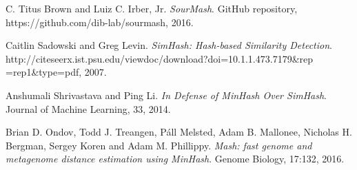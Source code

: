 \documentclass[12pt, letterpaper]{article}
\begin{document}
\begin{thebibliography}{9}

  C. Titus Brown and Luiz C. Irber, Jr.
  \textit{SourMash}.
  GitHub repository, https://github.com/dib-lab/sourmash, 2016.
  
  Caitlin Sadowski and Greg Levin.
  \textit{SimHash: Hash-based Similarity Detection}.
  http://citeseerx.ist.psu.edu/viewdoc/download?doi=10.1.1.473.7179\&rep\\=rep1\&type=pdf, 
  2007.

  Anshumali Shrivastava and Ping Li.
  \textit{In Defense of MinHash Over SimHash}.
  Journal of Machine Learning, 33, 2014.

  Brian D. Ondov, Todd J. Treangen, Páll Melsted, Adam B. Mallonee, Nicholas H. Bergman, Sergey Koren and Adam M. Phillippy.
  \textit{Mash: fast genome and metagenome distance estimation using MinHash}.
  Genome Biology, 17:132, 2016.

\end{thebibliography}

\clearpage
\appendix
\end{document}
